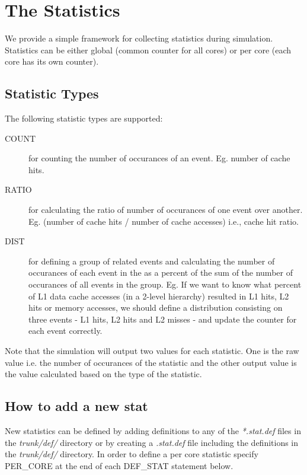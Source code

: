 

\chapter{The Statistics}
\label{sec:stat}

We provide a simple framework for collecting statistics during simulation.
Statistics can be either global (common counter for all cores) or per core
(each core has its own counter).

\section{Statistic Types}

The following statistic types are supported:

\begin{description}

  \item [COUNT] for counting the number of occurances of an event. Eg. number
  of cache hits. 

  \item [RATIO] for calculating the ratio of number of occurances of one event
  over another. Eg. (number of cache hits / number of cache accesses) i.e.,
  cache hit ratio.

  \item [DIST]  for defining a group of related events and calculating the
  number of occurances of each event in the as a percent of the sum of the
  number of occurances of all events in the group.  Eg. If we want to know what
  percent of L1 data cache accesses (in a 2-level hierarchy) resulted in L1
  hits, L2 hits or memory accesses, we should define a distribution consisting
  on three events - L1 hits, L2 hits and L2 misses  - and update the
  counter for each event correctly. 

\end{description}


Note that the simulation will output two values for each statistic. One is the
raw value i.e. the number of occurances of the statistic and the other output
value is the value calculated based on the type of the statistic.


\section{How to add a new stat}

New statistics can be defined by adding definitions to any of the
\textit{*.stat.def} files in the \textit{trunk/def/} directory or by creating a
\textit{.stat.def} file including the definitions in the \textit{trunk/def/}
directory.  In order to define a per core statistic specify PER\_CORE at the
end of each DEF\_STAT statement below.



